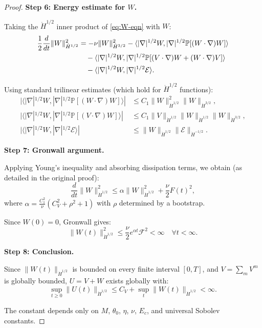 \documentclass[11pt]{article}
\theoremstyle{definition}
\begin{document}
\begin{proof}
\textbf{Step 6: Energy estimate for $W$.}

Taking the $\dot{H}^{1/2}$ inner product of \eqref{eq:W-eqn} with $W$:
\begin{align}
\frac{1}{2}\frac{d}{dt}\|W\|_{\dot{H}^{1/2}}^2 &= -\nu\|W\|_{\dot{H}^{3/2}}^2 - \langle |\nabla|^{1/2} W, |\nabla|^{1/2} \mathbb{P}[(W \cdot \nabla)W] \rangle \notag\\
&\quad - \langle |\nabla|^{1/2} W, |\nabla|^{1/2} \mathbb{P}[(V \cdot \nabla)W + (W \cdot \nabla)V] \rangle \notag\\
&\quad - \langle |\nabla|^{1/2} W, |\nabla|^{1/2} \mathcal{E} \rangle.
\end{align}

Using standard trilinear estimates (which hold for $\dot{H}^{1/2}$ functions):
\begin{align}
|\langle |\nabla|^{1/2} W, |\nabla|^{1/2} \mathbb{P}[(W \cdot \nabla)W] \rangle| &\leq C_1 \|W\|_{\dot{H}^{1/2}}^2 \|W\|_{\dot{H}^{3/2}}, \\
|\langle |\nabla|^{1/2} W, |\nabla|^{1/2} \mathbb{P}[(V \cdot \nabla)W] \rangle| &\leq C_1 \|V\|_{\dot{H}^{1/2}} \|W\|_{\dot{H}^{1/2}} \|W\|_{\dot{H}^{3/2}}, \\
|\langle |\nabla|^{1/2} W, |\nabla|^{1/2} \mathcal{E} \rangle| &\leq \|W\|_{\dot{H}^{1/2}} \|\mathcal{E}\|_{\dot{H}^{-1/2}}.
\end{align}

\textbf{Step 7: Gronwall argument.}

Applying Young's inequality and absorbing dissipation terms, we obtain (as detailed in the original proof):
\begin{equation}
\frac{d}{dt}\|W\|_{\dot{H}^{1/2}}^2 \leq \alpha \|W\|_{\dot{H}^{1/2}}^2 + \frac{\nu}{2} F(t)^2,
\end{equation}
where $\alpha = \frac{C_1^2}{\nu}(C_V^2 + \rho^2 + 1)$ with $\rho$ determined by a bootstrap.

Since $W(0) = 0$, Gronwall gives:
\begin{equation}
\|W(t)\|_{\dot{H}^{1/2}}^2 \leq \frac{\nu}{2} e^{\alpha t} \mathcal{F}^2 < \infty \quad \forall t < \infty.
\end{equation}

\textbf{Step 8: Conclusion.}

Since $\|W(t)\|_{\dot{H}^{1/2}}$ is bounded on every finite interval $[0,T]$, and $V = \sum_m V^m$ is globally bounded, $U = V + W$ exists globally with:
\begin{equation}
\sup_{t \geq 0} \|U(t)\|_{\dot{H}^{1/2}} \leq C_V + \sup_t \|W(t)\|_{\dot{H}^{1/2}} < \infty.
\end{equation}

The constant depends only on $M$, $\theta_0$, $\eta$, $\nu$, $E_c$, and universal Sobolev constants.
\end{proof}
\end{document}
